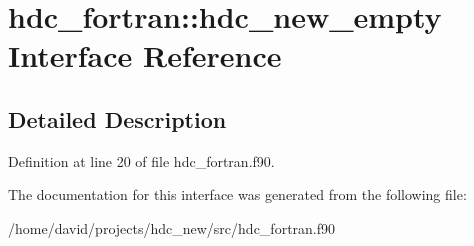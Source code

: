 \hypertarget{a00004}{}\section{hdc\+\_\+fortran\+:\+:hdc\+\_\+new\+\_\+empty Interface Reference}
\label{a00004}


\subsection{Detailed Description}


Definition at line 20 of file hdc\+\_\+fortran.\+f90.



The documentation for this interface was generated from the following file\+:\begin{DoxyCompactItemize}
\item 
/home/david/projects/hdc\+\_\+new/src/hdc\+\_\+fortran.\+f90\end{DoxyCompactItemize}
